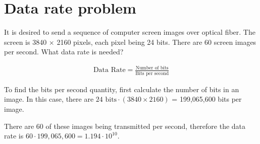 
\section{Data rate problem}
It is desired to send a sequence of computer screen images over optical fiber. The screen is 3840 $\times$ 2160 pixels, each pixel being 24 bits. There are 60 screen images per second. What data rate is needed?

\begin{align*}
	\text{Data Rate} = \frac{\text{Number of bits}}{\text{Bits per second}}
\end{align*}

To find the bits per second quantity, first calculate the number of bits in an image. In this case, there are $24 \text{ bits} \cdot (3840 \times 2160)$ = 199,065,600 bits per image. 

There are 60 of these images being transmitted per second, therefore the data rate is $60 \cdot 199,065,600 = 1.194 \cdot 10^{10}$.

\section{}
\section{}
\section{}
\section{}
\section{}
\section{}
